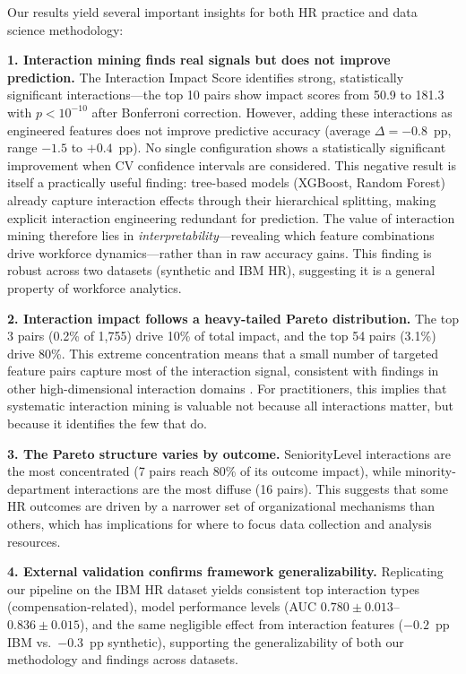 \documentclass[twocolumn]{article}
\begin{document}
Our results yield several important insights for both HR practice and data science methodology:

\textbf{1. Interaction mining finds real signals but does not improve prediction.} The Interaction Impact Score identifies strong, statistically significant interactions---the top 10 pairs show impact scores from 50.9 to 181.3 with $p < 10^{-10}$ after Bonferroni correction. However, adding these interactions as engineered features does not improve predictive accuracy (average $\Delta = -0.8$~pp, range $-1.5$ to $+0.4$~pp). No single configuration shows a statistically significant improvement when CV confidence intervals are considered. This negative result is itself a practically useful finding: tree-based models (XGBoost, Random Forest) already capture interaction effects through their hierarchical splitting, making explicit interaction engineering redundant for prediction. The value of interaction mining therefore lies in \textit{interpretability}---revealing which feature combinations drive workforce dynamics---rather than in raw accuracy gains. This finding is robust across two datasets (synthetic and IBM HR), suggesting it is a general property of workforce analytics.

\textbf{2. Interaction impact follows a heavy-tailed Pareto distribution.} The top 3 pairs (0.2\% of 1,755) drive 10\% of total impact, and the top 54 pairs (3.1\%) drive 80\%. This extreme concentration means that a small number of targeted feature pairs capture most of the interaction signal, consistent with findings in other high-dimensional interaction domains \cite{sorokina2008detecting}. For practitioners, this implies that systematic interaction mining is valuable not because all interactions matter, but because it identifies the few that do.

\textbf{3. The Pareto structure varies by outcome.} SeniorityLevel interactions are the most concentrated (7 pairs reach 80\% of its outcome impact), while minority-department interactions are the most diffuse (16 pairs). This suggests that some HR outcomes are driven by a narrower set of organizational mechanisms than others, which has implications for where to focus data collection and analysis resources.

\textbf{4. External validation confirms framework generalizability.} Replicating our pipeline on the IBM HR dataset yields consistent top interaction types (compensation-related), model performance levels (AUC $0.780\pm0.013$--$0.836\pm0.015$), and the same negligible effect from interaction features ($-0.2$~pp IBM vs.\ $-0.3$~pp synthetic), supporting the generalizability of both our methodology and findings across datasets.
\end{document}
